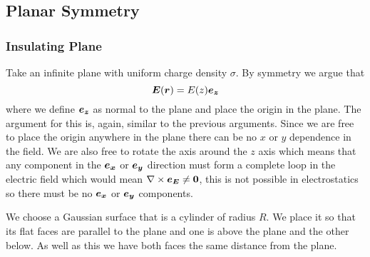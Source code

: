     \subsection{Planar Symmetry}
    \subsubsection{Insulating Plane}
    Take an infinite plane with uniform charge density \(\sigma\).
    By symmetry we argue that
    \[\bm{E}(\bm{r}) = E(z)\bm{e_{z}}\]
    where we define \(\bm{e_{z}}\) as normal to the plane and place the origin in the plane.
    The argument for this is, again, similar to the previous arguments.
    Since we are free to place the origin anywhere in the plane there can be no \(x\) or \(y\) dependence in the field.
    We are also free to rotate the axis around the \(z\) axis which means that any component in the \(\bm{e_{x}}\) or \(\bm{e_{y}}\) direction must form a complete loop in the electric field which would mean \(\nabla\times\bm{e_{E}} \ne \bm{0}\), this is not possible in electrostatics so there must be no \(\bm{e_{x}}\) or \(\bm{e_{y}}\) components.
    
    We choose a Gaussian surface that is a cylinder of radius \(R\).
    We place it so that its flat faces are parallel to the plane and one is above the plane and the other below.
    As well as this we have both faces the same distance from the plane.
    
